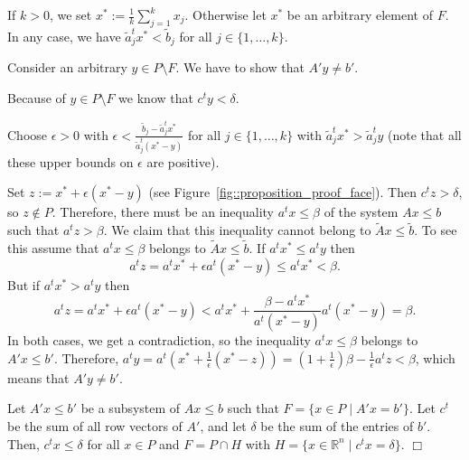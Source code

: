 \documentclass[12pt, showidx, twoside]{article}
\def\endproof{\hfill{$\Box$}}
\def\R{\mathbb{R}}
\begin{document}
{{{\begin{description}
        If $k > 0$, we set $x^* := \frac{1}{k}\sum_{j=1}^k x_j$.
        Otherwise let $x^*$ be an arbitrary element of $F$.
        In any case, we have $\tilde a_j^t x^* < \tilde b_j$ for all 
        $j \in \{1,\dots,k\}$.

        Consider an arbitrary $y \in P \setminus F$. We have to show
        that $A'y \neq b'$. 

        Because of $y \in P \setminus F$ we know that $c^t y < \delta$.

        Choose $\epsilon > 0$ with 
        $\epsilon < \frac{\tilde b_j - \tilde a_j^t x^*}{\tilde a_j^t (x^* - y)}$
        for all $j \in \{1,\dots,k\}$ with $\tilde a_j^t x^* > \tilde a_j^t y$
        (note that all these upper bounds on $\epsilon$ are positive).

         Set $z := x^* + \epsilon(x^* - y)$ (see Figure~\ref{fig::proposition_proof_face}).
         Then $c^t z > \delta$, so
         $z \not\in P$. Therefore, there must be an inequality $a^t x \leq \beta$
         of the system $A x \leq b$ such that $a^t z > \beta$. We claim that
         this inequality cannot belong to $\tilde A x \leq \tilde b$.
         To see this assume that $a^t x \leq \beta$ belongs to $\tilde A x \leq \tilde b$.
         If $a^t x^* \leq a^t y$ then
         \[
            a^t z = a^tx^* + \epsilon a^t(x^* - y) \leq a^tx^* < \beta.
         \]
         But if $a^t x^* > a^t y$ then
         \[
            a^t z = a^tx^* + \epsilon a^t(x^* - y) 
                  < a^tx^* + \frac{\beta - a^t x^*}{a^t (x^* - y)} 
                             a^t(x^* - y) = \beta.
         \]
         In both cases, we get a contradiction, so 
         the inequality $a^t x \leq \beta$ belongs to $A' x \leq b'$. 
         Therefore,
         $a^t y = a^t(x^* + \frac{1}{\epsilon}(x^* - z)) 
           = (1+\frac{1}{\epsilon})\beta - \frac{1}{\epsilon} a^t z
         < \beta$,
         which means that $A'y \neq b'$.
         \fi
   \item[``(c) $\Rightarrow$ (a)'':] 
        Let $A' x \leq b'$ be a subsystem of $Ax \leq b$ such that
        $F = \{x \in P \mid A'x = b'\}$.
        Let $c^t$ be the sum of all row vectors of
        $A'$, and let $\delta$ be the sum of the
        entries of $b'$. Then, $c^t x \leq \delta$ for all $x \in P$
        and $F = P \cap H$ with
        $H = \{x \in \R^n \mid c^t x=\delta\}$. \endproof
\end{description}





}}}
\end{document}

